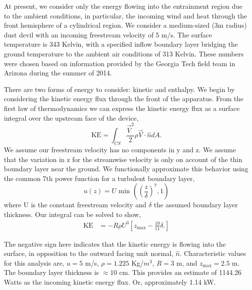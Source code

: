 At present, we consider only the energy flowing into the entrainment
region due to the ambient conditions, in particular, the incoming wind
and heat through the front hemisphere of a cylindrical region. We
consider a medium-sized (3m radius) dust devil with an incoming
freestream velocity of 5 m/s. The surface temperature is 343 Kelvin,
with a specified inflow boundary layer bridging the ground temperature
to the ambient air conditions of 313 Kelvin. 
These numbers were chosen
based on information provided by the Georgia Tech field team in Arizona
during the summer of 2014.  

There are two forms of energy to consider: kinetic and enthalpy. We
begin by considering the kinetic energy flux through the front of the
apparatus. From the first law of thermodynamics we can express the
kinetic energy flux as a surface integral over the upstream face of the device, 
\begin{equation*}
\text{KE} = \int_{CS} \frac{\vec V^2}{2} \rho \vec V \cdot \hat n dA.
\end{equation*}
%
%
We assume our freestream velocity has no components in y and z.
We assume that the variation in z for the streamwise velocity is only on
account of the thin boundary layer near the ground. We functionally
approximate this behavior using the common 7th power function for a
turbulent boundary layer,  
\begin{equation*}
  u(z) = U \text{ min }\left(\left(\frac{z}{\delta}\right)^7,1\right)
\end{equation*}
where U is the constant freestream velocity and $\delta$ the assumed
boundary layer thickness. Our integral can be solved to show, 
\begin{align*}
\text{KE} & = -R \rho U^3 \left[ z_{\text{max}} - \frac{10}{11}\delta.
\right]
\end{align*}


The negative sign here indicates that the kinetic energy is flowing into
the surface, in opposition to the outward facing unit normal, $\hat
n$. Characteristic values for this analysis are, $u = 5$ m/s, $\rho =
1.225$ Kg/$m^3$, $R = 3$ m, and $z_{\text{max}} = 2.5$ m. The boundary
layer thickness is $\approx 10$ cm. This provides
an estimate of 1144.26 Watts as the incoming kinetic energy flux. Or,
approximately 1.14 kW.  

